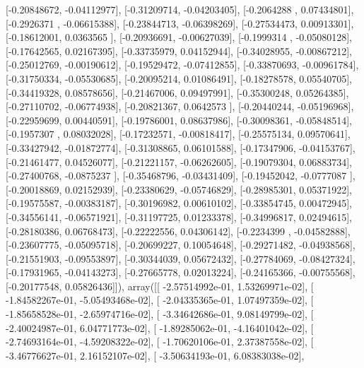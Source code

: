 \documentclass{article}
\begin{document}
       [-0.20848672, -0.04112977],
       [-0.31209714, -0.04203405],
       [-0.2064288 ,  0.07434801],
       [-0.2926371 , -0.06615388],
       [-0.23844713, -0.06398269],
       [-0.27534473,  0.00913301],
       [-0.18612001,  0.0363565 ],
       [-0.20936691, -0.00627039],
       [-0.1999314 , -0.05080128],
       [-0.17642565,  0.02167395],
       [-0.33735979,  0.04152944],
       [-0.34028955, -0.00867212],
       [-0.25012769, -0.00190612],
       [-0.19529472, -0.07412855],
       [-0.33870693, -0.00961784],
       [-0.31750334, -0.05530685],
       [-0.20095214,  0.01086491],
       [-0.18278578,  0.05540705],
       [-0.34419328,  0.08578656],
       [-0.21467006,  0.09497991],
       [-0.35300248,  0.05264385],
       [-0.27110702, -0.06774938],
       [-0.20821367,  0.0642573 ],
       [-0.20440244, -0.05196968],
       [-0.22959699,  0.00440591],
       [-0.19786001,  0.08637986],
       [-0.30098361, -0.05848514],
       [-0.1957307 ,  0.08032028],
       [-0.17232571, -0.00818417],
       [-0.25575134,  0.09570641],
       [-0.33427942, -0.01872774],
       [-0.31308865,  0.06101588],
       [-0.17347906, -0.04153767],
       [-0.21461477,  0.04526077],
       [-0.21221157, -0.06262605],
       [-0.19079304,  0.06883734],
       [-0.27400768, -0.0875237 ],
       [-0.35468796, -0.03431409],
       [-0.19452042, -0.0777087 ],
       [-0.20018869,  0.02152939],
       [-0.23380629, -0.05746829],
       [-0.28985301,  0.05371922],
       [-0.19575587, -0.00383187],
       [-0.30196982,  0.00610102],
       [-0.33854745,  0.00472945],
       [-0.34556141, -0.06571921],
       [-0.31197725,  0.01233378],
       [-0.34996817,  0.02494615],
       [-0.28180386,  0.06768473],
       [-0.22222556,  0.04306142],
       [-0.2234399 , -0.04582888],
       [-0.23607775, -0.05095718],
       [-0.20699227,  0.10054648],
       [-0.29271482, -0.04938568],
       [-0.21551903, -0.09553897],
       [-0.30344039,  0.05672432],
       [-0.27784069, -0.08427324],
       [-0.17931965, -0.04143273],
       [-0.27665778,  0.02013224],
       [-0.24165366, -0.00755568],
       [-0.20177548,  0.05826436]]), array([[ -2.57514992e-01,   1.53269971e-02],
       [ -1.84582267e-01,  -5.05493468e-02],
       [ -2.04335365e-01,   1.07497359e-02],
       [ -1.85658528e-01,  -2.65974716e-02],
       [ -3.34642686e-01,   9.08149799e-02],
       [ -2.40024987e-01,   6.04771773e-02],
       [ -1.89285062e-01,  -4.16401042e-02],
       [ -2.74693164e-01,  -4.59208322e-02],
       [ -1.70620106e-01,   2.37387558e-02],
       [ -3.46776627e-01,   2.16152107e-02],
       [ -3.50634193e-01,   6.08383038e-02],
\end{document}
